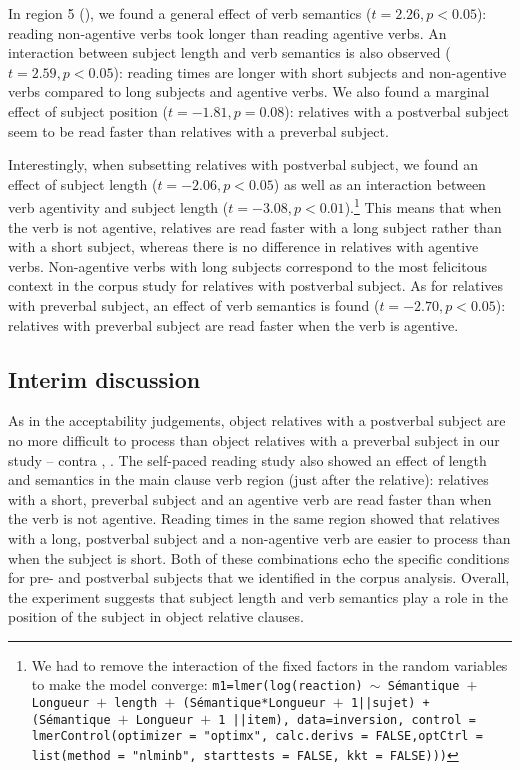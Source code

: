 \documentclass[output=paper]{langscibook}
\begin{document}
In region 5 (), we found a general effect of verb semantics ($t=2.26,\allowbreak p<0.05$): reading non-agentive verbs took longer than reading agentive verbs. An interaction between subject length and verb semantics is also observed ($t=2.59,\allowbreak p<0.05$): reading times are longer with short subjects and non-agentive verbs compared to long subjects and agentive verbs. We also found a marginal effect of subject position ($t=-1.81, p=0.08$): relatives with a postverbal subject seem to be read faster than relatives with a preverbal subject. 


Interestingly, when subsetting relatives with postverbal subject, we found an effect of subject length ($t=-2.06, p<0.05$) as well as an interaction between verb agentivity and subject length ($t=-3.08, p<0.01$).\footnote{We had to remove the interaction of the fixed factors in the random variables to make the model converge: \texttt{m1=lmer(log(reaction) $\sim$ Sémantique $+$ Longueur $+$ length $+$ (Sémantique*Longueur $+$ 1||sujet) + (Sémantique $+$ Longueur $+$ 1 ||item), 
 data=inversion, control = lmerControl(optimizer = "optimx", calc.derivs = FALSE,optCtrl = list(method = "nlminb", starttests = FALSE, kkt = FALSE)))} }
This means that when the verb is not agentive, relatives are read faster with a long subject rather than with a short subject, whereas there is no difference in relatives with agentive verbs. Non-agentive verbs with long subjects correspond to the most felicitous context in the corpus study for relatives with postverbal subject. As for relatives with preverbal subject, an effect of verb semantics is found ($t=-2.70, p<0.05$): relatives with preverbal subject are read faster when the verb is agentive. 

 
 
 
\subsection{Interim discussion}
As in the acceptability judgements, object relatives with a postverbal subject are no more difficult to process than object relatives with a preverbal subject in our study -- contra \citet{Holmes1981}, \citet{pozniak2015processing}. The self-paced reading study also showed an effect of length and semantics in the main clause verb region (just after the relative): relatives with a short, preverbal subject and an agentive verb are read faster than when the verb is not agentive. Reading times in the same region showed that relatives with a long, postverbal subject and a non-agentive verb are easier to process than when the subject is short. Both of these combinations echo the specific conditions for pre- and postverbal subjects that we identified in the corpus analysis. Overall, the experiment suggests that subject length and verb semantics play a role in the position of the subject in object relative clauses. 
\end{document}
